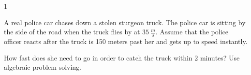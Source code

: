 
\AddToShipoutPicture*{\BackgroundPic}

\addtocounter {ProbNum} {1}

 
{\bf \Large{}}A real police car chases down a stolen sturgeon truck.  The police car is sitting by the side of the road when the truck flies by at ${35~\tfrac{m}{s}}$.  Assume that the police officer reacts after the truck is 150 meters past her and gets up to speed instantly.  
 

\bigskip
How fast does she need to go in order to catch the truck within 2 minutes? Use algebraic problem-solving.
 
\vfill

\newpage